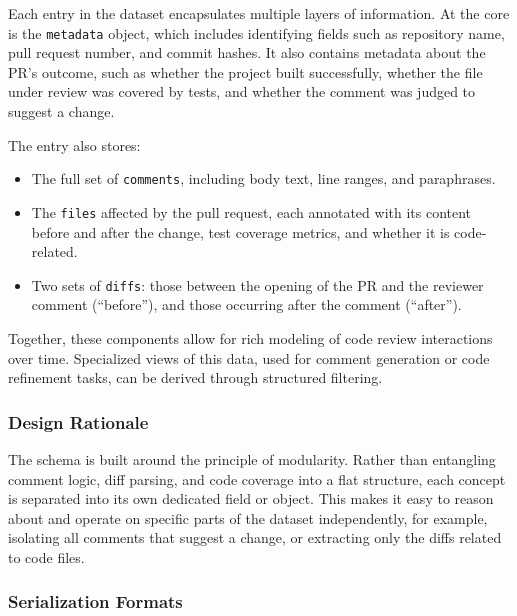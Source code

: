 Each entry in the dataset encapsulates multiple layers of information. At the core is the
\texttt{metadata} object, which includes identifying fields such as repository name, pull request
number, and commit hashes. It also contains metadata about the PR’s outcome, such as whether the
project built successfully, whether the file under review was covered by tests, and whether the
comment was judged to suggest a change.

The entry also stores:
\begin{itemize}
	\item The full set of \texttt{comments}, including body text, line ranges, and paraphrases.
	\item The \texttt{files} affected by the pull request, each annotated with its content before
	      and after the change, test coverage metrics, and whether it is code-related.
	\item Two sets of \texttt{diffs}: those between the opening of the PR and the reviewer comment
	      (``before''), and those occurring after the comment (``after'').
\end{itemize}

Together, these components allow for rich modeling of code review interactions over time.
Specialized views of this data, used for comment generation or code refinement tasks, can be derived
through structured filtering.

\subsubsection{Design Rationale}

The schema is built around the principle of modularity. Rather than entangling comment logic, diff
parsing, and code coverage into a flat structure, each concept is separated into its own dedicated
field or object. This makes it easy to reason about and operate on specific parts of the dataset
independently, for example, isolating all comments that suggest a change, or extracting only the
diffs related to code files.

\subsubsection{Serialization Formats}


